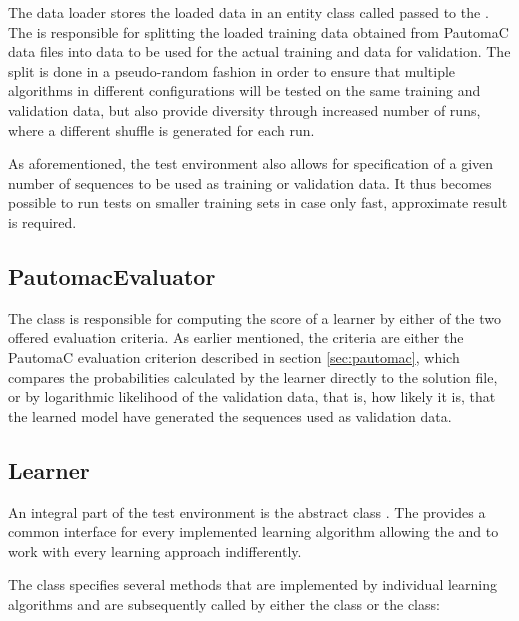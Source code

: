 The data loader stores the loaded data in an entity class called  passed to the . The  is responsible for splitting the loaded training data obtained from PautomaC data files into data to be used for the actual training and data for validation. The split is done in a pseudo-random fashion in order to ensure that multiple algorithms in different configurations will be tested on the same training and validation data, but also provide diversity through increased number of runs, where a different shuffle is generated for each run.

As aforementioned, the test environment also allows for specification of a given number of sequences to be used as training or validation data. It thus becomes possible to run tests on smaller training sets in case only fast, approximate result is required.

\subsection{PautomacEvaluator}
The  class is responsible for computing the score of a learner by either of the two offered evaluation criteria. As earlier mentioned, the criteria are either the PautomaC evaluation criterion described in section \ref{sec:pautomac}, which compares the probabilities calculated by the learner directly to the solution file, or by logarithmic likelihood of the validation data, that is, how likely it is, that the learned model have generated the sequences used as validation data.

\subsection{Learner}
An integral part of the test environment is the abstract class . The  provides a common interface for every implemented learning algorithm allowing the  and  to work with every learning approach indifferently.

The  class specifies several methods that are implemented by individual learning algorithms and are subsequently called by either the  class or the  class:

